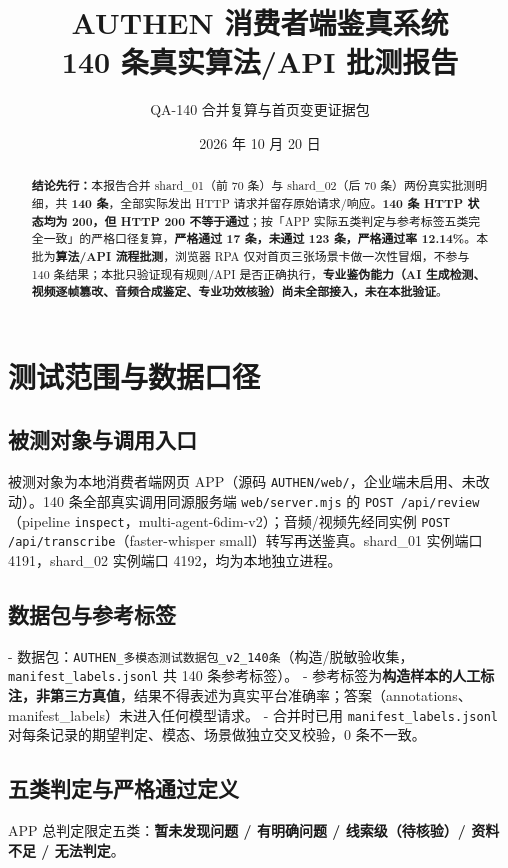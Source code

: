\documentclass[11pt,a4paper]{ctexart}
\title{\textbf{AUTHEN 消费者端鉴真系统\\140 条真实算法/API 批测报告}}
\author{QA-140 合并复算与首页变更证据包}
\date{2026 年 10 月 20 日}
\begin{document}
\maketitle
\thispagestyle{empty}

\begin{abstract}
\noindent\textbf{结论先行：}本报告合并 shard\_01（前 70 条）与 shard\_02（后 70 条）两份真实批测明细，共 \textbf{140 条}，全部实际发出 HTTP 请求并留存原始请求/响应。\textbf{140 条 HTTP 状态均为 200，但 HTTP 200 不等于通过}；按「APP 实际五类判定与参考标签五类完全一致」的严格口径复算，\textbf{严格通过 17 条，未通过 123 条，严格通过率 12.14\%}。本批为\textbf{算法/API 流程批测}，浏览器 RPA 仅对首页三张场景卡做一次性冒烟，不参与 140 条结果；本批只验证现有规则/API 是否正确执行，\textbf{专业鉴伪能力（AI 生成检测、视频逐帧篡改、音频合成鉴定、专业功效核验）尚未全部接入，未在本批验证}。
\end{abstract}

\tableofcontents
\newpage

\section{测试范围与数据口径}

\subsection{被测对象与调用入口}
被测对象为本地消费者端网页 APP（源码 \texttt{AUTHEN/web/}，企业端未启用、未改动）。140 条全部真实调用同源服务端 \texttt{web/server.mjs} 的 \texttt{POST /api/review}（pipeline \texttt{inspect}，multi-agent-6dim-v2）；音频/视频先经同实例 \texttt{POST /api/transcribe}（faster-whisper small）转写再送鉴真。shard\_01 实例端口 4191，shard\_02 实例端口 4192，均为本地独立进程。

\subsection{数据包与参考标签}
- 数据包：\texttt{AUTHEN\_多模态测试数据包\_v2\_140条}（构造/脱敏验收集，\texttt{manifest\_labels.jsonl} 共 140 条参考标签）。
- 参考标签为\textbf{构造样本的人工标注，非第三方真值}，结果不得表述为真实平台准确率；答案（annotations、manifest\_labels）未进入任何模型请求。
- 合并时已用 \texttt{manifest\_labels.jsonl} 对每条记录的期望判定、模态、场景做独立交叉校验，0 条不一致。

\subsection{五类判定与严格通过定义}
APP 总判定限定五类：\textbf{暂未发现问题 / 有明确问题 / 线索级（待核验）/ 资料不足 / 无法判定}。
\end{document}
